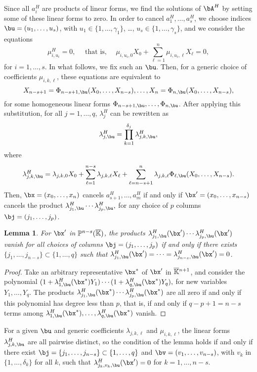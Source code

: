 \documentclass[12pt]{article}
\newtheorem{lemma}[definition]{Lemma}
\begin{document}
Since all $a_i^H$ are products of linear forms, we find the solutions
of $\bA^H$ by setting some of these linear forms to zero. In order to
cancel $a_1^H,\dots,a_s^H$, we choose indices $\bu=(u_1,\dots,u_s)$,
with $u_1\in\{1,\dots,\gamma_1\}$, \dots,
$u_s\in\{1,\dots,\gamma_s\}$, and we consider the equations 
$$\mu^H_{i,u_i}=0, \quad \text{~that is,~} \quad \mu_{i,u_i,0}X_0 + \sum_{\ell = 1}^{n}\mu_{i,u_i,\ell}X_\ell =0,$$ for $i=1,\dots,s$.
In what follows, we fix such an $\bu$.
Then, for a generic choice of coefficients $\mu_{i,k,\ell}$, these equations
are equivalent to
$$X_{n-s+1}=\Phi_{n-s+1,\bu}(X_0,\dots,X_{n-s}),\dots,X_{n}=\Phi_{n,\bu}(X_0,\dots,X_{n-s}),$$
for some homogeneous linear forms
$\Phi_{n-s+1,\bu},\dots,\Phi_{n,\bu}$.  After applying this
substitution, for all $j=1,\dots,q$, $\lambda^H_j$ can be rewritten as
$$\lambda^H_{j,\bu}=\prod_{k=1}^{\delta_j}\lambda^H_{j,k,\bu},$$
where 
$$\lambda^H_{j,k,\bu}=\lambda_{j,k,0}X_0 + \sum_{\ell =
  1}^{n-s}\lambda_{j,k,\ell}X_\ell + \sum_{\ell =
  n-s+1}^{n}\lambda_{j,k,\ell}
\Phi_{\ell,\bu}(X_0,\dots,X_{n-s}).$$ Then,
$\bx=(x_0,\dots,x_n)$ cancels $a^H_{s+1},\dots,a^H_m$ if and only if
$\bx'=(x_0,\dots,x_{n-s})$ cancels the product
$\lambda^H_{j_1,\bu}\cdots \lambda^H_{j_p,\bu},$ for any choice of $p$ columns
$\bj=(j_1,\dots,j_p)$.

\begin{lemma}
  For $\bx'$ in $\mathbb{P}^{n-s}(\overline{\mathbb{K}})$, the products
  $\lambda^H_{j_1,\bu}(\bx')\cdots \lambda^H_{j_p,\bu}(\bx')$
  vanish for all choices of columns $\bj=(j_1,\dots,j_p)$ if and only
  if there exists $\{j_1,\dots,j_{n-s}\} \subset \{1,\dots,q\}$ such 
  that $\lambda^H_{j_1,\bu}(\bx')=\cdots=\lambda^H_{j_{n-s},\bu}(\bx')=0$.
\end{lemma}
\begin{proof}
  Take an arbitrary representative $\bx^*$ of $\bx'$ in
  $\overline{\mathbb{K}}{}^{n+1}$, and consider the polynomial 
  $(1+\lambda^H_{1,\bu}(\bx^*)Y_1) \cdots (1+\lambda^H_{q,\bu}(\bx^*)Y_q),$
  for new variables $Y_1,\dots,Y_q$. The products
  $\lambda^H_{j_1,\bu}(\bx^*)\cdots \lambda^H_{j_p,\bu}(\bx^*)$ are all zero
  if and only if this polynomial has degree less than $p$, that is, if
  and only if $q-p+1=n-s$ terms among
  $\lambda^H_{1,\bu}(\bx^*),\dots,\lambda^H_{q,\bu}(\bx^*)$ vanish.
\end{proof}


For a given $\bu$ and generic coefficients $\lambda_{j,k,\ell}$ and $\mu_{i,k,\ell}$,
 the linear forms $\lambda^H_{j,k,\bu}$ are all pairwise distinct, so
the condition of the lemma holds if and only if there exist
$\bj=\{j_1,\dots,j_{n-s}\} \subset \{1,\dots,q\}$ and
$\bv=(v_1,\dots,v_{n-s})$, with $v_k$ in $\{1,\dots,\delta_k\}$ for all
$k$, such that $\lambda^H_{j_k,v_k,\bu}(\bx')=0$ 
for $k=1,\dots,n-s$.
\end{document}
